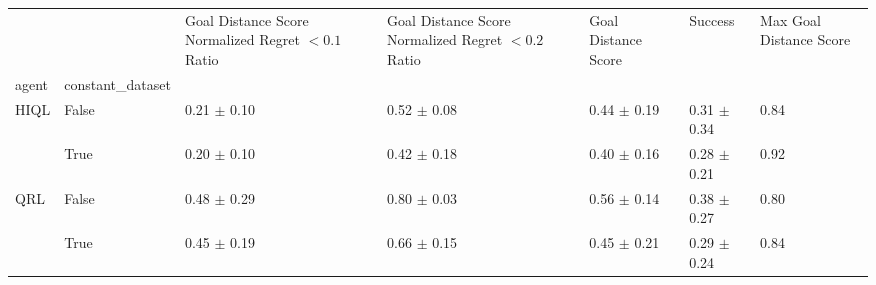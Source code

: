 \begin{tabular}{lllllll}
\toprule
 &  & Goal Distance Score Normalized Regret $< 0.1$ Ratio & Goal Distance Score Normalized Regret $< 0.2$ Ratio & Goal Distance Score & Success & Max Goal Distance Score \\
agent & constant_dataset &  &  &  &  &  \\
\midrule
\multirow[t]{2}{*}{HIQL} & False & 0.21 $\pm$ 0.10 & 0.52 $\pm$ 0.08 & 0.44 $\pm$ 0.19 & 0.31 $\pm$ 0.34 & 0.84 \\
 & True & 0.20 $\pm$ 0.10 & 0.42 $\pm$ 0.18 & 0.40 $\pm$ 0.16 & 0.28 $\pm$ 0.21 & 0.92 \\
\cline{1-7}
\multirow[t]{2}{*}{QRL} & False & 0.48 $\pm$ 0.29 & 0.80 $\pm$ 0.03 & 0.56 $\pm$ 0.14 & 0.38 $\pm$ 0.27 & 0.80 \\
 & True & 0.45 $\pm$ 0.19 & 0.66 $\pm$ 0.15 & 0.45 $\pm$ 0.21 & 0.29 $\pm$ 0.24 & 0.84 \\
\cline{1-7}
\bottomrule
\end{tabular}
